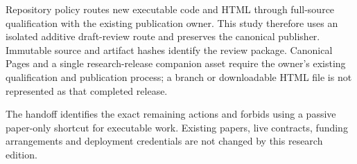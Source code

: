 Repository policy routes new executable code and HTML through full-source qualification with the existing publication owner. This study therefore uses an isolated additive draft-review route and preserves the canonical publisher. Immutable source and artifact hashes identify the review package. Canonical Pages and a single research-release companion asset require the owner's existing qualification and publication process; a branch or downloadable HTML file is not represented as that completed release.

The handoff identifies the exact remaining actions and forbids using a passive paper-only shortcut for executable work. Existing papers, live contracts, funding arrangements and deployment credentials are not changed by this research edition.
